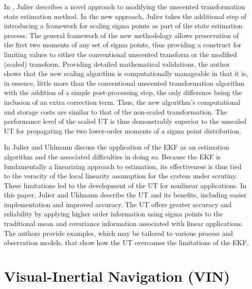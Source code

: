 In \cite{Julier2002}, Julier describes a novel approach to modifying the unscented transformation state estimation method. In the new approach, Julier takes the additional step of introducing a framework for scaling sigma points as part of the state estimation process. The general framework of the new methodology allows preservation of the first two moments of any set of sigma points, thus providing a construct for limiting values to either the conventional unscented transform or the modified (scaled) transform. Providing detailed mathematical validations, the author shows that the new scaling algorithm is computationally manageable in that it is, in essence, little more than the conventional unscented transformation algorithm with the addition of a simple post-processing step, the only difference being the inclusion of an extra correction term. Thus, the new algorithm's computational and storage costs are similar to that of the non-scaled transformation. The performance level of the scaled UT is thus demonstrably superior to the unscaled UT for propagating the two lower-order moments of a sigma point distribution.

In \cite{Julier2004} Julier and Uhlmann discuss the application of the EKF as an estimation algorithm and the associated difficulties in doing so. Because the EKF is fundamentally a linearizing approach to estimation, its effectiveness is thus tied to the veracity of the local linearity assumption for the system under scrutiny. These limitations led to the development of the UT for nonlinear applications. In this paper, Julier and Uhlmann describe the UT and its benefits, including easier implementation and improved accuracy. The UT offers greater accuracy and reliability by applying higher order information using sigma points to the traditional mean and covariance information associated with linear applications. The authors provide examples, which may be tailored to various process and observation models, that show how the UT overcomes the limitations of the EKF.

\section{Visual-Inertial Navigation (VIN)}

